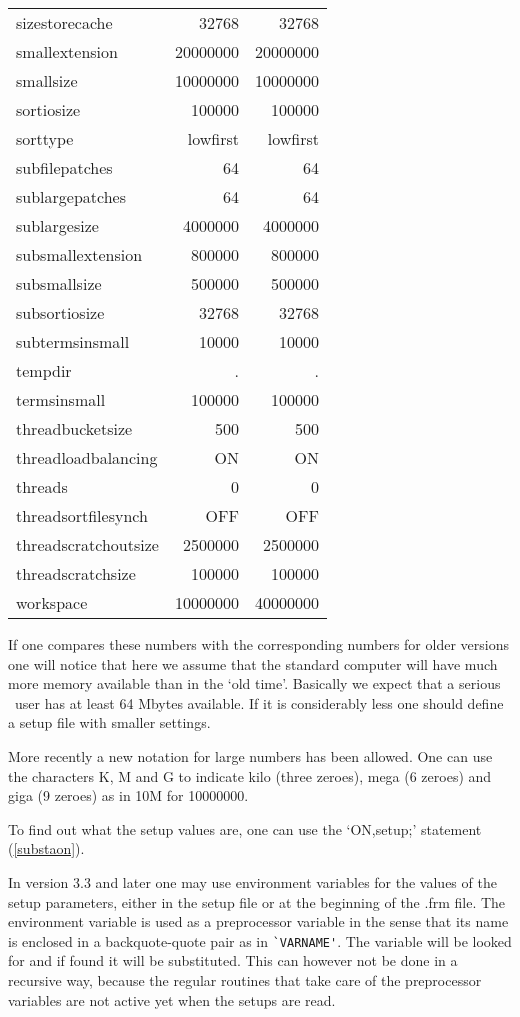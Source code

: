 \begin{center}
\begin{tabular}{lrr}
sizestorecache &        32768         & 32768 \\
smallextension &        20000000      & 20000000 \\
smallsize &             10000000      & 10000000 \\
sortiosize &            100000        & 100000 \\
sorttype &              lowfirst      & lowfirst \\
subfilepatches &        64            & 64 \\
sublargepatches &       64            & 64 \\
sublargesize &          4000000       & 4000000 \\
subsmallextension &     800000        & 800000 \\
subsmallsize &          500000        & 500000 \\
subsortiosize &         32768         & 32768 \\
subtermsinsmall &       10000         & 10000 \\
tempdir &               .             & . \\
termsinsmall &          100000        & 100000 \\
threadbucketsize &      500           & 500 \\
threadloadbalancing &   ON            & ON \\
threads &               0             & 0 \\
threadsortfilesynch &   OFF           & OFF \\
threadscratchoutsize &  2500000       & 2500000 \\
threadscratchsize &     100000        & 100000 \\
workspace &             10000000      & 40000000
\end{tabular}
\end{center}
If one compares these numbers with the corresponding numbers for older 
versions one will notice that here we assume that the standard computer 
will have much more memory available than in the `old time'. Basically we 
expect that a serious \FORM\ user has at least 64 Mbytes available. If it is 
considerably less one should define a setup file with smaller settings.

More recently a new notation for large numbers has been allowed. One can 
use the characters K, M and G to indicate kilo (three zeroes), mega (6 
zeroes) and giga (9 zeroes) as in 10M for 10000000.

To find out what the setup values are, one can use the `ON,setup;' 
statement (\ref{substaon}).

In version 3.3 and later one may use environment 
variables for the values of the setup parameters, either in the setup file 
or at the beginning of the .frm file. The environment variable is used as a 
preprocessor variable in the sense that its name is enclosed in a 
backquote-quote pair as in \verb:`VARNAME':. The variable will be looked 
for and if found it will be substituted. This can however not be done in a 
recursive way, because the regular routines that take care of the 
preprocessor variables are not active yet when the setups are read.
